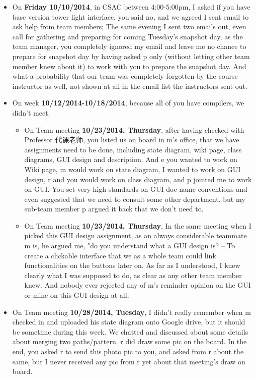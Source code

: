 \documentclass[9pt,b5paper]{article}
\begin{document}
\begin{itemize}
\item On \textbf{Friday 10/10/2014}, in CSAC between 4:00-5:00pm, I asked if you have base version tower light interface, you said no, and we agreed I sent email to ask help from team members; The same evening I sent two emails out, even call for gathering and preparing for coming Tuesday's snapshot day, as the team manager, you completely ignored my email and leave me no chance to prepare for snapshot day by having asked p only (without letting other team member knew about it) to work with you to prepare the snapshot day. And what a probability that our team was completely forgotten by the course instructor as well, not shown at all in the email list the instructors sent out.

\item On week \textbf{10/12/2014-10/18/2014}, because all of you have compilers, we didn't meet. 

\begin{itemize}
\item On Team meeting \textbf{10/23/2014, Thursday}, after having checked with Professor 代课老师, you listed us on board in m's office, that we have assignments need to be done, including state diagram, wiki page, class diagrams, GUI design and description. And e you wanted to work on Wiki page, m would work on state diagram, I wanted to work on GUI design, r and you would work on class diagram, and p jointed me to work on GUI. You set very high standards on GUI doc name conventions and even suggested that we need to consult some other department, but my sub-team member p argued it back that we don't need to.

\item On Team meeting \textbf{10/23/2014, Thursday}, In the same meeting when I picked this GUI design assignment, as an always considerable teammate m is, he argued me, "do you understand what a GUI design is? -- To create a clickable interface that we as a whole team could link functionalities on the buttons later on.  As far as I understood, I knew clearly what I was supposed to do, as clear as any other team member knew. And nobody ever rejected any of m's reminder opinion on the GUI or mine on this GUI design at all.
\end{itemize}

\item On Team meeting \textbf{10/28/2014, Tuesday}, I didn't really remember when m checked in and uploaded his state diagram onto Google drive, but it should be sometime during this week. We chatted and discussed about some details about merging two paths/pattern. r did draw some pic on the board. In the end, you asked r to send this photo pic to you, and asked from r about the same, but I never received any pic from r yet about that meeting's draw on board. 


\end{itemize}
\end{document}
